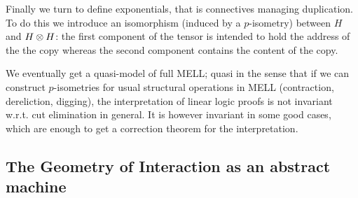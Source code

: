 Finally we turn to define exponentials, that is connectives managing
duplication. To do this we introduce an isomorphism (induced by a
\(p\)-isometry) between \(H\) and \(H\otimes H\): the first component of
the tensor is intended to hold the address of the the copy whereas the
second component contains the content of the copy.

We eventually get a quasi-model of full MELL; quasi in the sense that if
we can construct \(p\)-isometries for usual structural operations in
MELL (contraction, dereliction, digging), the interpretation of linear
logic proofs is not invariant w.r.t. cut elimination in general. It is
however invariant in some good cases, which are enough to get a
correction theorem for the interpretation.


\subsection{The Geometry of Interaction as an abstract machine}\label{the-geometry-of-interaction-as-an-abstract-machine}


